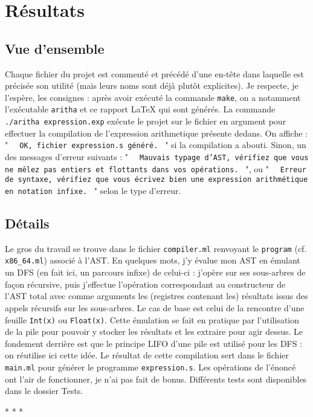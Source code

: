 \documentclass[12pt,french]{article}
\newcommand{\inlinecode}[1]{%
  \texttt{%
    \setlength{\spaceskip}{0.5em plus 1em minus 0.1em}%
    \ifdim\lastskip>0pt \unskip\hspace{0.5em plus 0.5em minus 0.1em}\fi
    #1
  }%
}
\begin{document}
\section{Résultats}
\subsection{Vue d'ensemble}
Chaque fichier du projet est commenté et précédé d'une en-tête dans laquelle est précisée son utilité (mais leurs noms sont déjà plutôt explicites). Je respecte, je l'espère, les consignes : après avoir exécuté la commande \texttt{make}, on a notamment l'exécutable \texttt{aritha} et ce rapport {\LaTeX}  qui sont générés. La commande \texttt{./aritha expression.exp} exécute le projet sur le fichier en argument pour effectuer la compilation de l'expression arithmetique présente dedans. On affiche  : "\inlinecode{OK, fichier expression.s généré.}" si la compilation a abouti. Sinon, un des messages d'erreur suivants : "\inlinecode{Mauvais typage d'AST, vérifiez que vous ne mêlez pas entiers et flottants dans vos opérations.}", ou "\inlinecode{Erreur de syntaxe, vérifiez que vous écrivez bien une expression arithmétique en notation infixe.}" selon le type d'erreur.
\subsection{Détails}
Le gros du travail se trouve dans le fichier \texttt{compiler.ml} renvoyant le \texttt{program} (cf. \texttt{x86\_64.ml}) associé à l'AST. En quelques mots, j'y évalue mon AST en émulant un DFS (en fait ici, un parcours infixe) de celui-ci : j'opère sur ses sous-arbres de façon récursive, puis j'effectue l'opération correspondant au constructeur de l'AST total avec comme arguments les (registres contenant les) résultats issus des appels récursifs sur les sous-arbres. Le cas de base est celui de la rencontre d'une feuille \texttt{Int(x)} ou \texttt{Float(x)}. Cette émulation se fait en pratique par l'utilisation de la pile pour pouvoir y stocker les résultats et les extraire pour agir dessus. Le fondement derrière est que le principe LIFO d'une pile est utilisé pour les DFS : on réutilise ici cette idée. Le résultat de cette compilation sert dans le fichier \texttt{main.ml} pour générer le programme \texttt{expression.s}. Les opérations de l'énoncé ont l'air de fonctionner, je n'ai pas fait de bonus. Différents tests sont disponibles dans le dossier \textsf{Tests}.\newline
\newline
\begin{center}
    *  *  *
\end{center}
\end{document}
